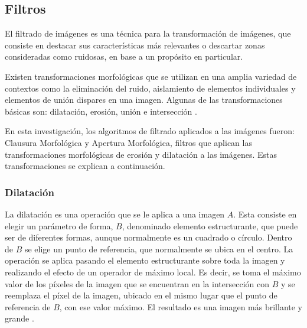 \subsection{Filtros}\label{sec:Transfor}
El filtrado de imágenes es una técnica para la transformación de imágenes, que consiste en destacar  sus características más relevantes o descartar zonas consideradas como ruidosas, en base a un propósito en particular. 

Existen transformaciones morfológicas que se utilizan en una amplia variedad de contextos como la eliminación del ruido, aislamiento de elementos individuales y elementos de unión dispares en una imagen. Algunas de las transformaciones básicas son: dilatación, erosión, uni\'on e intersecci\'on \cite{BookOpenCv}.

En esta investigación, los algoritmos de filtrado aplicados a las imágenes fueron: Clausura Morfológica y Apertura Morfológica, filtros que aplican las transformaciones morfológicas de erosión y dilatación a las imágenes. Estas transformaciones se explican a continuación.

 

\subsubsection{Dilatación}

La dilatación es una operación que se le aplica a una imagen $A$. Esta consiste en elegir un parámetro de forma, $B$, denominado elemento estructurante, que puede ser de diferentes formas, aunque normalmente es un cuadrado o círculo. Dentro de $B$ se elige un punto de referencia, que normalmente se ubica en el centro.
La operación se aplica pasando el elemento estructurante sobre toda la imagen y realizando el efecto de un operador de máximo local. Es decir, se toma el m\'aximo valor de los píxeles de la imagen que se encuentran en la intersección con $B$ y se reemplaza el píxel de la imagen, ubicado en el mismo lugar que el punto de referencia de $B$, con ese valor máximo. El resultado es una imagen más brillante  y grande \cite{BookOpenCv}. 

